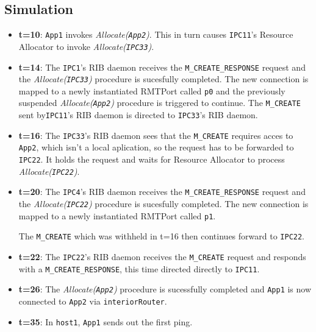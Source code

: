         \subsection{Simulation}

            \begin{itemize}
            \item \textbf{t=10}: \texttt{App1} invokes \emph{Allocate(\texttt{App2})}. This in turn causes \texttt{IPC11}'s Resource Allocator to invoke \emph{Allocate(\texttt{IPC33})}.

            \item \textbf{t=14}: The \texttt{IPC1}'s RIB daemon receives the \texttt{M\_CREATE\_RESPONSE} request and the \emph{Allocate(\texttt{IPC33})} procedure is sucesfully completed. The new connection is mapped to a newly instantiated RMTPort called \texttt{p0} and the previously suspended \emph{Allocate(\texttt{App2})} procedure is triggered to continue. The \texttt{M\_CREATE} sent by\texttt{IPC11}'s RIB daemon is directed to \texttt{IPC33}'s RIB daemon.

            \item \textbf{t=16}: The \texttt{IPC33}'s RIB daemon sees that the \texttt{M\_CREATE} requires acces to \texttt{App2}, which isn't a local aplication, so the request has to be forwarded to \texttt{IPC22}. It holds the request and waits for Resource Allocator to process \emph{Allocate(\texttt{IPC22})}.

            \item \textbf{t=20}: The \texttt{IPC4}'s RIB daemon receives the \texttt{M\_CREATE\_RESPONSE} request and the \emph{Allocate(\texttt{IPC22})} procedure is sucesfully completed. The new connection is mapped to a newly instantiated RMTPort called \texttt{p1}.

            The \texttt{M\_CREATE} which was withheld in t=16 then continues forward to \texttt{IPC22}.

            \item \textbf{t=22}: The \texttt{IPC22}'s RIB daemon receives the \texttt{M\_CREATE} request and responds with a \texttt{M\_CREATE\_RESPONSE}, this time directed directly to \texttt{IPC11}.

            \item \textbf{t=26}: The \emph{Allocate(\texttt{App2})} procedure is sucessfully completed and \texttt{App1} is now connected to \texttt{App2} via \texttt{interiorRouter}.

            \item \textbf{t=35}: In \texttt{host1}, \texttt{App1} sends out the first ping.


\end{itemize}
